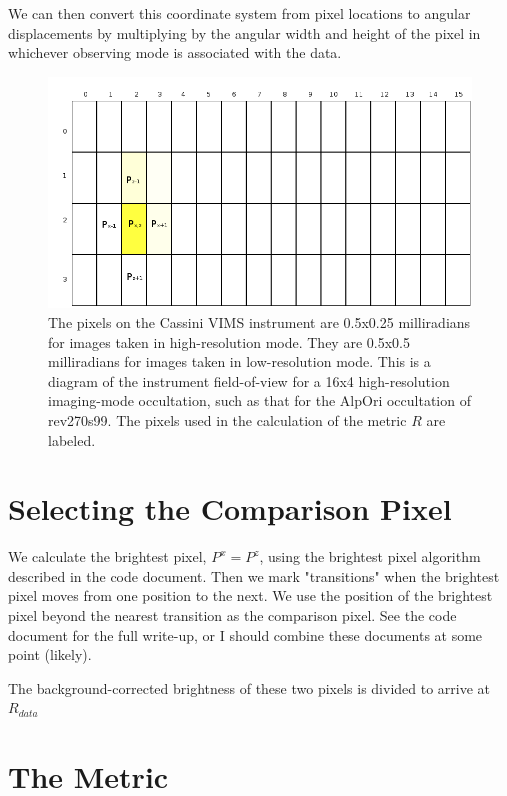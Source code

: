 \documentclass[12pt]{article}
\begin{document}
We can then convert this coordinate system from pixel locations to angular
displacements by multiplying by the angular width and height of the pixel in
whichever observing mode is associated with the data.

\begin{figure}[h!]
\centering
\includegraphics[scale=0.5]{figs/PixelGrid.png}
\caption{
The pixels on the Cassini VIMS instrument are 0.5x0.25 milliradians for images
taken in high-resolution mode. They are 0.5x0.5 milliradians for images taken
in low-resolution mode. This is a diagram of the instrument field-of-view for a
16x4 high-resolution imaging-mode occultation, such as that for the AlpOri
occultation of rev270s99. The pixels used in the calculation of the metric $R$
are labeled.
}
\label{fig:pixels}
\end{figure}

\section{Selecting the Comparison Pixel}

We calculate the brightest pixel, $P^x=P^z$, using the brightest pixel
algorithm described in the code document. Then we mark "transitions" when the
brightest pixel moves from one position to the next. We use the position of the
brightest pixel beyond the nearest transition as the comparison pixel. See the
code document for the full write-up, or I should combine these documents at
some point (likely).

The background-corrected brightness of these two pixels is divided to arrive at
$R_{data}$

\section{The Metric}
\end{document}
